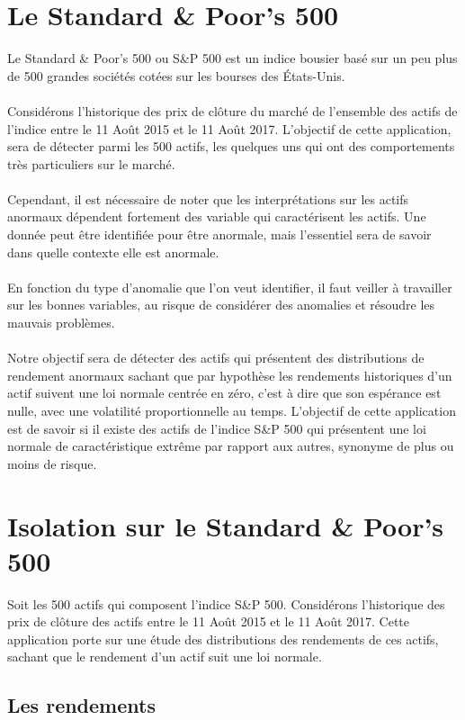 \section{Le Standard \& Poor's 500}

Le Standard \& Poor's 500 ou S\&P 500 est un indice bousier basé sur un peu plus de 500 grandes sociétés cotées sur les bourses des États-Unis.
\\
\\
Considérons l'historique des prix de clôture du marché de l'ensemble des actifs de l'indice entre le 11 Août 2015 et le  11 Août 2017. L'objectif de cette application, sera de détecter parmi les 500 actifs, les quelques uns qui ont des comportements très particuliers sur le marché.
\\
\\
Cependant, il est nécessaire de noter que les interprétations sur les actifs anormaux dépendent fortement des variable qui caractérisent les actifs. Une donnée peut être identifiée pour être anormale, mais l'essentiel sera de savoir dans quelle contexte elle est anormale.
\\
\\
En fonction du type d'anomalie que l'on veut identifier, il faut veiller à travailler sur les bonnes variables, au risque de considérer des anomalies et résoudre les mauvais problèmes.
\\
\\
Notre objectif sera de détecter des actifs qui présentent des distributions de rendement anormaux sachant que par hypothèse les rendements historiques d'un actif suivent une loi normale centrée en zéro, c'est à dire que son espérance est nulle, avec une volatilité proportionnelle au temps. L'objectif de cette application est de savoir si il existe des actifs de l'indice S\&P 500 qui présentent une loi normale de caractéristique extrême par rapport aux autres, synonyme de plus ou moins de risque.

\section{Isolation sur le Standard \& Poor's 500}

Soit les 500 actifs qui composent l'indice S\&P 500. 
Considérons l'historique des prix de clôture des actifs entre le 11 Août 2015 et le  11 Août 2017.
Cette application porte sur une étude des distributions des rendements de ces actifs, sachant que le rendement d'un actif suit une loi normale. 

\subsection{Les rendements}


